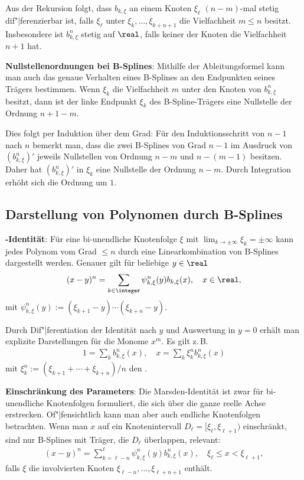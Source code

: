 Aus der Rekursion folgt, dass $b_{k,\xi}$ an einem Knoten $\xi_\ell$
$(n - m)$-mal stetig dif"|ferenzierbar ist, falls $\xi_\ell$ unter $\xi_k, \dotsc, \xi_{k+n+1}$
die Vielfachheit $m \le n$ besitzt.
Insbesondere ist $b_{k,\xi}^n$ stetig auf $\real$, falls keiner der Knoten die Vielfachheit
$n + 1$ hat.

\linie

\textbf{Nullstellenordnungen bei B-Splines}:
Mithilfe der Ableitungsformel kann man auch das genaue Verhalten eines B-Splines an den Endpunkten
seines Trägers bestimmen.
Wenn $\xi_k$ die Vielfachheit $m$ unter den Knoten von $b_{k,\xi}^n$ besitzt, dann ist der
linke Endpunkt $\xi_k$ des B-Spline-Trägers eine Nullstelle der Ordnung $n + 1 - m$.

Dies folgt per Induktion über dem Grad:
Für den Induktionsschritt von $n - 1$ nach $n$ bemerkt man, dass die zwei B-Splines von Grad
$n - 1$ im Ausdruck von $(b_{k,\xi}^n)'$ jeweils Nullstellen von Ordnung $n - m$ und $n - (m - 1)$
besitzen.
Daher hat $(b_{k,\xi}^n)'$ in $\xi_k$ eine Nullstelle der Ordnung $n - m$.
Durch Integration erhöht sich die Ordnung um $1$.

\subsection{%
    Darstellung von Polynomen durch B-Splines%
}

\textbf{-Identität}:
Für eine bi-unendliche Knotenfolge $\xi$ mit $\lim_{k \to \pm\infty} \xi_k = \pm\infty$
kann jedes Polynom vom Grad $\le n$ durch eine Linearkombination von B-Splines dargestellt werden.
Genauer gilt für beliebige $y \in \real$
\begin{align*}
    (x - y)^n = \sum_{k \in \integer} \psi_{k,\xi}^n(y) b_{k,\xi}(x),\quad x \in \real,
\end{align*}
mit $\psi_{k,\xi}^n(y) := (\xi_{k+1} - y) \dotsm (\xi_{k+n} - y)$.

Durch Dif"|ferentiation der Identität nach $y$ und Auswertung in $y = 0$ erhält man explizite
Darstellungen für die Monome $x^m$.
Es gilt z.\,B.
\begin{align*}
    1 = \sum_k b_{k,\xi}^n(x),\quad
    x = \sum_k \xi_k^n b_{k,\xi}^n(x)
\end{align*}
mit $\xi_k^n := (\xi_{k+1} + \dotsb + \xi_{k+n})/n$ den .

\linie
\pagebreak

\textbf{Einschränkung des Parameters}:
Die Marsden-Identität ist zwar für bi-unendliche Knotenfolgen formuliert, die sich über die ganze
reelle Achse erstrecken.
Of"|fensichtlich kann man aber auch endliche Knotenfolgen betrachten.
Wenn man $x$ auf ein Knotenintervall $D_\ell = [\xi_\ell, \xi_{\ell+1})$ einschränkt,
sind nur B-Splines mit Träger, die $D_\ell$ überlappen, relevant:
\begin{align*}
    (x - y)^n = \sum_{k=\ell-n}^\ell \psi_{k,\xi}^n(y) b_{k,\xi}^n(x),\quad
    \xi_\ell \le x < \xi_{\ell+1},
\end{align*}
falls $\xi$ die involvierten Knoten $\xi_{\ell-n}, \dotsc, \xi_{\ell+n+1}$ enthält.

